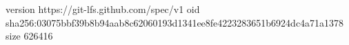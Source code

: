 version https://git-lfs.github.com/spec/v1
oid sha256:03075bbf39b8b94aab8c62060193d1341ee8fe4223283651b6924dc4a71a1378
size 626416
